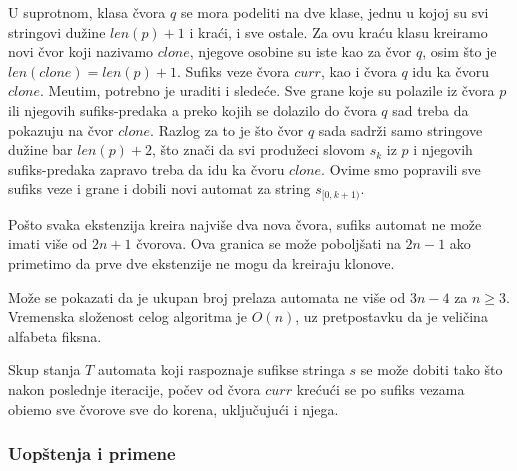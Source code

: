 U suprotnom, klasa \v cvora $q$ se mora podeliti na dve klase, jednu u kojoj su svi stringovi du\v zine $len(p)+1$ i kra\' ci, i sve ostale. Za ovu kra\' cu klasu kreiramo novi \v cvor koji nazivamo $clone$, njegove osobine su iste kao za \v cvor $q$, osim \v sto je $len(clone) = len(p)+1$. Sufiks veze \v cvora $curr$, kao i \v cvora $q$ idu ka \v cvoru $clone$. Me\dj utim, potrebno je uraditi i slede\' ce. Sve grane koje su polazile iz \v cvora $p$ ili njegovih sufiks-predaka a preko kojih se dolazilo do \v cvora $q$ sad treba da pokazuju na \v cvor $clone$. Razlog za to je \v sto \v cvor $q$ sada sadr\v zi samo stringove du\v zine bar $len(p) + 2$, \v sto zna\v ci da svi produ\v zeci slovom $s_k$ iz $p$ i njegovih sufiks-predaka zapravo treba da idu ka \v cvoru $clone$. Ovime smo popravili sve sufiks veze i grane i dobili novi automat za string $s_{[0, k+1)}$.

\noindent
\begin{minipage}[l]{\textwidth}

\end{minipage}

\noindent
\begin{minipage}[l]{\textwidth}

\end{minipage}

Po\v sto svaka ekstenzija kreira najvi\v se dva nova \v cvora, sufiks automat ne mo\v ze imati vi\v se od $2n+1$ \v cvorova. Ova granica se mo\v ze pobolj\v sati na $2n-1$ ako primetimo da prve dve ekstenzije ne mogu da kreiraju klonove.

Mo\v ze se pokazati da je ukupan broj prelaza automata ne vi\v se od $3n-4$ za $n \geq 3$. Vremenska slo\v zenost celog algoritma je $O(n)$, uz pretpostavku da je veli\v cina alfabeta fiksna. \cite{suffixautomatonrad}

Skup stanja $T$ automata koji raspoznaje sufikse stringa $s$ se mo\v ze dobiti tako \v sto nakon poslednje iteracije, po\v cev od \v cvora $curr$ kre\' cu\' ci se po sufiks vezama obi\dj emo sve \v cvorove sve do korena, uklju\v cuju\' ci i njega.

\subsubsection{Uop\v stenja i primene}

